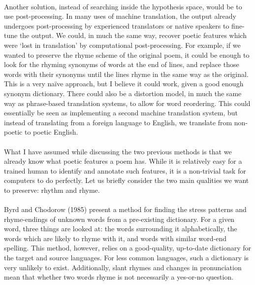 \paragraph{}{Another solution, instead of searching inside the
  hypothesis space, would be to use post-processing. In many uses of
  machine translation, the output already undergoes post-processing by
  experienced translators or native speakers to fine-tune the output.
  We could, in much the same way, recover poetic features which were
  `lost in translation' by computational post-processing. For example,
  if we wanted to preserve the rhyme scheme of the original poem, it
  could be enough to look for the rhyming synonyms of words at the end
  of lines, and replace those words with their synonyms until the
  lines rhyme in the same way as the original. This is a very
  na{\"i}ve approach, but I believe it could work, given a good enough
  synonym dictionary. There could also be a distortion model, in much
  the same way as phrase-based translation systems, to allow for word
  reordering. This could essentially be seen as implementing a second
  machine translation system, but instead of translating from a
  foreign language to English, we translate from non-poetic to poetic
  English. }

\paragraph{}{What I have assumed while discussing the two previous
  methods is that we already know what poetic features a poem
  has. While it is relatively easy for a trained human to identify and
  annotate such features, it is a non-trivial task for computers to do
  perfectly. Let us briefly consider the two main qualities we want to
  preserve: rhythm and rhyme. }
\paragraph{}{Byrd and Chodorow (1985) \cite{byrd} present a method for
  finding the stress patterns and rhyme-endings of unknown words from
  a pre-existing dictionary. For a given word, three things are looked
  at: the words surrounding it alphabetically, the words which are
  likely to rhyme with it, and words with similar word-end
  spelling. This method, however, relies on a good-quality, up-to-date
  dictionary for the target and source languages. For less common
  languages, such a dictionary is very unlikely to
  exist. Additionally, slant rhymes and changes in pronunciation mean
  that whether two words rhyme is not necessarily a yes-or-no
  question.}
